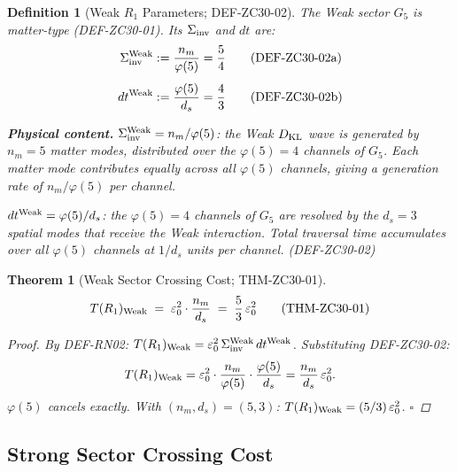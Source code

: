 \documentclass[12pt, a4paper]{article}
\newtheorem{theorem}{Theorem}[section]
\newtheorem{definition}{Definition}[section]
\begin{document}
\begin{definition}[Weak $R_1$ Parameters; DEF-ZC30-02]
\label{zc30:def:weak-params}
The Weak sector $G_5$ is matter-type (DEF-ZC30-01).
Its $\Sigma_{\rm inv}$ and $dt$ are:
\begin{align}
  \Sigma_{\rm inv}^{\rm Weak}
  &:= \frac{n_m}{\varphi(5)}
   = \frac{5}{4}
  \tag{DEF-ZC30-02a}\label{zc30:def:sigma-w}\\[4pt]
  dt^{\rm Weak}
  &:= \frac{\varphi(5)}{d_s}
   = \frac{4}{3}
  \tag{DEF-ZC30-02b}\label{zc30:def:dt-w}
\end{align}

\textbf{Physical content.}
$\Sigma_{\rm inv}^{\rm Weak} = n_m/\varphi(5)$:
the Weak $D_{\rm KL}$ wave is generated by $n_m = 5$ matter modes,
distributed over the $\varphi(5) = 4$ channels of $G_5$.
Each matter mode contributes equally across all $\varphi(5)$ channels,
giving a generation rate of $n_m/\varphi(5)$ per channel.

$dt^{\rm Weak} = \varphi(5)/d_s$:
the $\varphi(5) = 4$ channels of $G_5$ are resolved by the
$d_s = 3$ spatial modes that receive the Weak interaction.
Total traversal time accumulates over all $\varphi(5)$ channels
at $1/d_s$ units per channel.
\hfill\textup{(DEF-ZC30-02)}
\end{definition}

\begin{theorem}[Weak Sector Crossing Cost; THM-ZC30-01]
\label{zc30:thm:weak}
\[
  T(R_1)_{\rm Weak}
  \;=\;
  \varepsilon_0^2 \cdot \frac{n_m}{d_s}
  \;=\;
  \frac{5}{3}\,\varepsilon_0^2
  \tag{THM-ZC30-01}\label{zc30:thm:tr1w}
\]

\begin{proof}
By DEF-RN02:
$T(R_1)_{\rm Weak}
  = \varepsilon_0^2\,\Sigma_{\rm inv}^{\rm Weak}\,dt^{\rm Weak}$.
Substituting DEF-ZC30-02:
\[
  T(R_1)_{\rm Weak}
  = \varepsilon_0^2 \cdot
    \frac{n_m}{\varphi(5)} \cdot \frac{\varphi(5)}{d_s}
  = \frac{n_m}{d_s}\,\varepsilon_0^2.
\]
$\varphi(5)$ cancels exactly.
With $(n_m, d_s) = (5, 3)$:
$T(R_1)_{\rm Weak} = (5/3)\,\varepsilon_0^2$.
\hfill$\square$
\end{proof}
\end{theorem}

\subsection{Strong Sector Crossing Cost}
\label{zc30:sec:strong}
\end{document}
